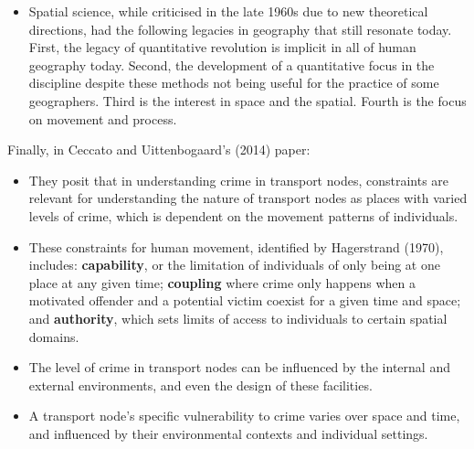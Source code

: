 \documentclass[a4paper, 10.5pt]{article} %
\begin{document}
\begin{itemize}
	\item Spatial science, while criticised in the late 1960s due to new theoretical directions, had the following legacies in geography that still resonate today. First, the legacy of quantitative revolution is implicit in all of human geography today. Second, the development of a quantitative focus in the discipline despite these methods not being useful for the practice of some geographers. Third is the interest in space and the spatial. Fourth is the focus on movement and process.
\end{itemize}

\vspace{10pt}

Finally, in Ceccato and Uittenbogaard's (2014) paper:

\begin{itemize}
  \item They posit that in understanding crime in transport nodes, constraints are relevant for understanding the nature of transport nodes as places with varied levels of crime, which is dependent on the movement patterns of individuals.
	\item These constraints for human movement, identified by Hagerstrand (1970), includes: \textbf{capability}, or the limitation of individuals of only being at one place at any given time; \textbf{coupling} where crime only happens when a motivated offender and a potential victim coexist for a given time and space; and \textbf{authority}, which sets limits of access to individuals to certain spatial domains.
	\item The level of crime in transport nodes can be influenced by the internal and external environments, and even the design of these facilities.
	\item A transport node's specific vulnerability to crime varies over space and time, and influenced by their environmental contexts and individual settings.
\end{itemize}






\end{document}
